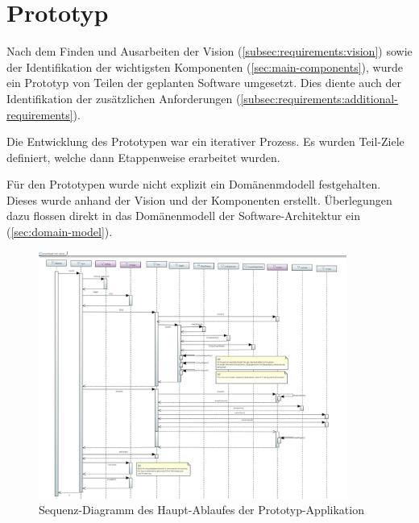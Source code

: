 
\section{Prototyp}
\label{sec:prototype}

Nach dem Finden und Ausarbeiten der Vision (\ref{subsec:requirements:vision})
sowie der Identifikation der wichtigsten Komponenten
(\ref{sec:main-components}), wurde ein Prototyp von Teilen der geplanten
Software umgesetzt. Dies diente auch der Identifikation der zusätzlichen
Anforderungen (\ref{subsec:requirements:additional-requirements}).

Die Entwicklung des Prototypen war ein iterativer Prozess. Es wurden Teil-Ziele
definiert, welche dann Etappenweise erarbeitet wurden.

Für den Prototypen wurde nicht explizit ein Domänenmdodell festgehalten. Dieses
wurde anhand der Vision und der Komponenten erstellt. Überlegungen dazu flossen
direkt in das Domänenmodell der Software-Architektur ein
(\ref{sec:domain-model}).

\begin{figure}[H]
    \centering
    \includegraphics[width=0.9\textwidth]{img/prototype_sequence_diagram.png}
    \caption{Sequenz-Diagramm des Haupt-Ablaufes der
        Prototyp-Applikation\protect\footnotemark}\label{fig:sequence-diagram:prototype}
\end{figure}


